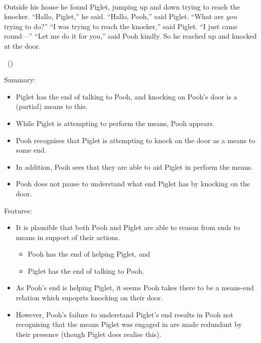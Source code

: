 \documentclass[10pt]{article}
\begin{document}
\begin{scenario}\mbox{ }

  Outside his house he found Piglet, jumping up and down trying to reach the knocker.\newline
  ``Hallo, Piglet,'' he said.\newline
  ``Hallo, Pooh,'' said Piglet.\newline
  ``What are \emph{you} trying to do?''\newline
  ``I was trying to reach the knocker,'' said Piglet.
  ``I just came round---''\newline
  ``Let me do it for you,'' said Pooh kindly.
  So he reached up and knocked at the door.

  \mbox{ }\hfill\mbox{(\cite[77--78]{Milne:2009aa})}
\end{scenario}

\begin{center}
\end{center}

Summary:
\begin{itemize}
\item Piglet has the end of talking to Pooh, and knocking on Pooh's door is a (partial) means to this.
\item While Piglet is attempting to perform the means, Pooh appears.
\item Pooh recognises that Piglet is attempting to knock on the door as a means to some end.
\item In addition, Pooh sees that they are able to aid Piglet in perform the means.
\item Pooh does not pause to understand what end Piglet has by knocking on the door.
\end{itemize}

Features:
\begin{itemize}
\item It is plausible that both Pooh and Piglet are able to reason from ends to means in support of their actions.
  \begin{itemize}
  \item Pooh has the end of helping Piglet, and
  \item Piglet has the end of talking to Pooh.
  \end{itemize}
\item As Pooh's end is helping Piglet, it seems Pooh takes there to be a means-end relation which supoprts knocking on their door.
\item However, Pooh's failure to understand Piglet's end results in Pooh not recognising that the means Piglet was engaged in are made redundant by their presence (though Piglet does realise this).
\end{itemize}
\end{document}

